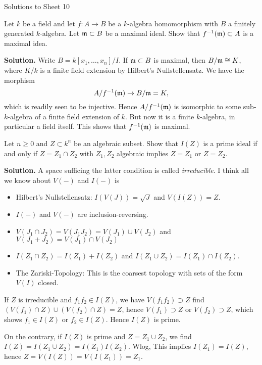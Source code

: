 \documentclass[a4paper,11pt]{article}
\begin{document}
\begin{center}
    \huge{Solutions to Sheet 10}
\end{center}

Let $k$ be a field and let $f: A\to B$ be a $k$-algebra homomorphism
with $B$ a finitely generated $k$-algebra. Let $\mathfrak{m} \subset B$ be 
a maximal ideal. Show that $f^{-1}(\mathfrak{m}) \subset A$ is a maximal idea.

\textbf{Solution.} Write $B = k[x_1, \dots, x_n]/I$. If $\mathfrak{m} \subset B$
is maximal, then $B/\mathfrak{m} \cong K$, where $K/k$ is a finite field extension 
by Hilbert's Nullstellensatz. We have the morphism
\begin{equation*}
    A/f^{-1}(\mathfrak{m}) \to B/\mathfrak{m} = K,
\end{equation*}
which is readily seen to be injective. Hence $A/f^{-1}(\mathfrak{m})$ is isomorphic to some 
sub-$k$-algebra of a finite field extension of $k$. But now it is a finite
$k$-algebra, in particular a field itself. This shows that $f^{-1}(\mathfrak{m})$ 
is maximal.


Let $n \geq 0$ and $Z \subset k^n$ be an algebraic subset. Show that $I(Z)$
is a prime ideal if and only if $Z = Z_1 \cap Z_2$ with $Z_1, Z_2$ 
algebraic implies $Z = Z_1$ or $Z = Z_2$. 

\textbf{Solution.} A space sufficing the latter condition is called
\textit{irreducible}. I think all we know about $V(-)$ and 
$I(-)$ is
\begin{itemize}
    \item Hilbert's Nullstellensatz: $I(V(J)) = \sqrt J$ and $V(I(Z)) = Z$. 
    \item $I(-)$ and $V(-)$ are inclusion-reversing.
    \item $V(J_1 \cap J_2) = V(J_1 J_2) = V(J_1) \cup V(J_2)$ and $V(J_1 + J_2) = 
        V(J_1) \cap V(J_2)$
    \item $I(Z_1 \cap Z_2) = I(Z_1)+I(Z_2)$ and $I(Z_1 \cup Z_2) = I(Z_1)\cap
        I(Z_2)$. 
    \item The Zariski-Topology: This is the coarsest topology with sets of
        the form $V(I)$ closed. 
\end{itemize}

If $Z$ is irreducible and $f_1 f_2 \in I(Z)$,
we have $V(f_1 f_2) \supset Z$ find $( V(f_1) \cap Z ) \cup ( V(f_2) \cap Z ) =
Z$, hence $V(f_1) \supset Z$ or $V(f_2) \supset Z$, which shows 
$f_1 \in I(Z)$ or $f_2 \in I(Z)$. Hence $I(Z)$ is prime. 

On the contrary, if $I(Z)$ is prime and $Z = Z_1 \cup Z_2$, we find 
$I(Z) = I(Z_1 \cup Z_2) = I(Z_1) I(Z_2)$. Wlog, This implies $I(Z_1) = I(Z)$,
hence $Z = V(I(Z)) = V(I(Z_1)) = Z_1$.
\end{document}
